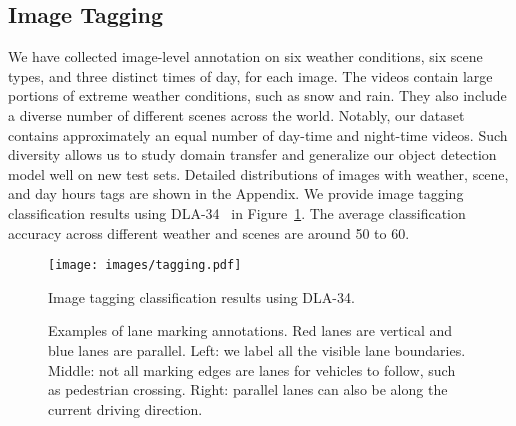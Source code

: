 \vspace{-1mm}
\subsection{Image Tagging}
\vspace{-1mm}
We have collected image-level annotation on six weather conditions, six scene types, and three distinct times of day, for each image. The videos contain large portions of extreme weather conditions, such as snow and rain. They also include a diverse number of different scenes across the world. Notably, our dataset contains approximately an equal number of day-time and night-time videos. Such diversity allows us to study domain transfer and generalize our object detection model well on new test sets. Detailed distributions of images with weather, scene, and day hours tags are shown in the Appendix. We provide image tagging classification results using DLA-34~\cite{dla} in Figure~\ref{fig:tagging}. The average classification accuracy across different weather and scenes are around 50 to 60.

\begin{figure}[h]
    \centering
    \texttt{[image: images/tagging.pdf]}
    \vspace{-5mm}
    \caption{\small Image tagging classification results using DLA-34.\vspace{-4mm}}
    \label{fig:tagging}
\end{figure}

\begin{figure*}[tp]
    \centering
    \caption{\small Examples of lane marking annotations. Red lanes are vertical and blue lanes are parallel. Left: we label all the visible lane boundaries. Middle: not all marking edges are lanes for vehicles to follow, such as pedestrian crossing. Right: parallel lanes can also be along the current driving direction.\vspace{-2mm}}
    \label{fig:lane_examples}
\end{figure*}

